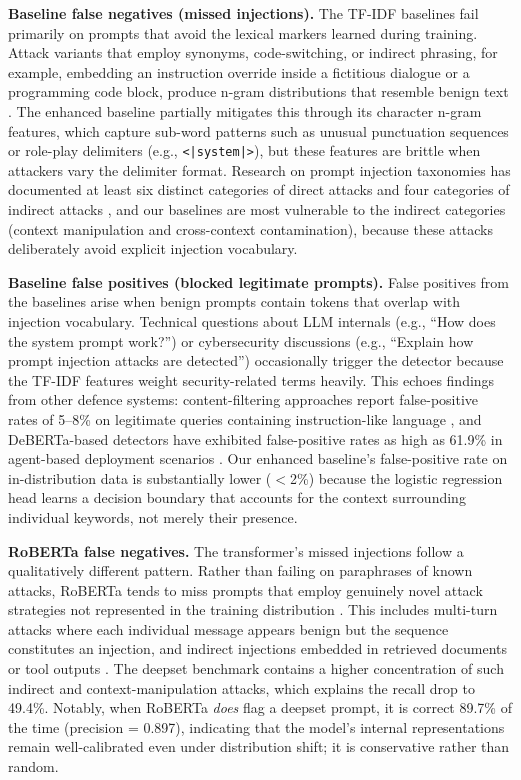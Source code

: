 \documentclass[12pt, letterpaper]{article}   %
\begin{document}
\textbf{Baseline false negatives (missed injections).} The TF-IDF baselines fail primarily on prompts that avoid the lexical markers learned during training. Attack variants that employ synonyms, code-switching, or indirect phrasing, for example, embedding an instruction override inside a fictitious dialogue or a programming code block, produce n-gram distributions that resemble benign text \cite{ref30}\cite{ref25}. The enhanced baseline partially mitigates this through its character n-gram features, which capture sub-word patterns such as unusual punctuation sequences or role-play delimiters (e.g., \texttt{<|system|>}), but these features are brittle when attackers vary the delimiter format. Research on prompt injection taxonomies has documented at least six distinct categories of direct attacks and four categories of indirect attacks \cite{ref30}\cite{ref19}, and our baselines are most vulnerable to the indirect categories (context manipulation and cross-context contamination), because these attacks deliberately avoid explicit injection vocabulary.

\textbf{Baseline false positives (blocked legitimate prompts).} False positives from the baselines arise when benign prompts contain tokens that overlap with injection vocabulary. Technical questions about LLM internals (e.g., ``How does the system prompt work?'') or cybersecurity discussions (e.g., ``Explain how prompt injection attacks are detected'') occasionally trigger the detector because the TF-IDF features weight security-related terms heavily. This echoes findings from other defence systems: content-filtering approaches report false-positive rates of 5--8\% on legitimate queries containing instruction-like language \cite{ref34}, and DeBERTa-based detectors have exhibited false-positive rates as high as 61.9\% in agent-based deployment scenarios \cite{ref35}. Our enhanced baseline's false-positive rate on in-distribution data is substantially lower ($<$2\%) because the logistic regression head learns a decision boundary that accounts for the context surrounding individual keywords, not merely their presence.

\textbf{RoBERTa false negatives.} The transformer's missed injections follow a qualitatively different pattern. Rather than failing on paraphrases of known attacks, RoBERTa tends to miss prompts that employ genuinely novel attack strategies not represented in the training distribution \cite{ref10}\cite{ref3}. This includes multi-turn attacks where each individual message appears benign but the sequence constitutes an injection, and indirect injections embedded in retrieved documents or tool outputs \cite{ref34}\cite{ref30}. The deepset benchmark contains a higher concentration of such indirect and context-manipulation attacks, which explains the recall drop to 49.4\%. Notably, when RoBERTa \textit{does} flag a deepset prompt, it is correct 89.7\% of the time (precision = 0.897), indicating that the model's internal representations remain well-calibrated even under distribution shift; it is conservative rather than random.
\end{document}
